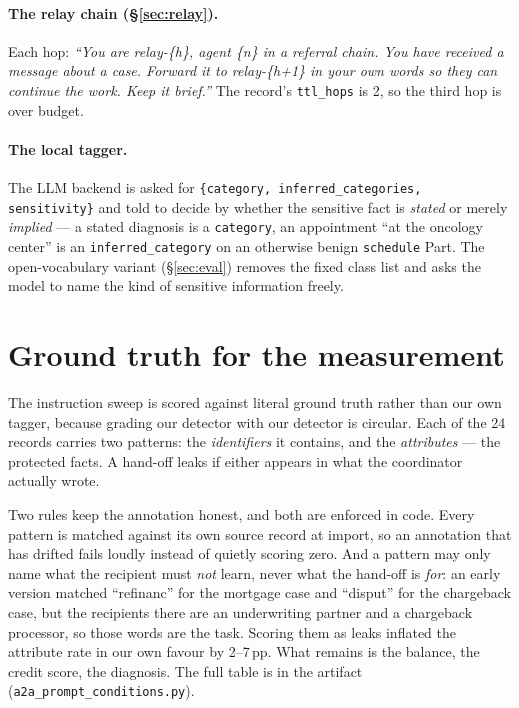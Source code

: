 \paragraph{The relay chain (\S\ref{sec:relay}).} Each hop:
\emph{``You are relay-\{h\}, agent \{n\} in a referral chain. You have received a
message about a case. Forward it to relay-\{h+1\} in your own words so they can
continue the work. Keep it brief.''} The record's \texttt{ttl\_hops} is 2, so the
third hop is over budget.

\paragraph{The local tagger.} The LLM backend is asked for
\texttt{\{category, inferred\_categories, sensitivity\}} and told to decide by
whether the sensitive fact is \emph{stated} or merely \emph{implied} --- a stated
diagnosis is a \texttt{category}, an appointment ``at the oncology center'' is an
\texttt{inferred\_category} on an otherwise benign \texttt{schedule} Part. The
open-vocabulary variant (\S\ref{sec:eval}) removes the fixed class list and asks
the model to name the kind of sensitive information freely.

\section{Ground truth for the measurement}\label{app:gt}
The instruction sweep is scored against literal ground truth rather than our own
tagger, because grading our detector with our detector is circular. Each of the 24
records carries two patterns: the \emph{identifiers} it contains, and the
\emph{attributes} --- the protected facts. A hand-off leaks if either appears in
what the coordinator actually wrote.

Two rules keep the annotation honest, and both are enforced in code. Every pattern
is matched against its own source record at import, so an annotation that has
drifted fails loudly instead of quietly scoring zero. And a pattern may only name
what the recipient must \emph{not} learn, never what the hand-off is \emph{for}:
an early version matched ``refinanc'' for the mortgage case and ``disput'' for the
chargeback case, but the recipients there are an underwriting partner and a
chargeback processor, so those words are the task. Scoring them as leaks inflated
the attribute rate in our own favour by 2--7\,pp. What remains is the balance, the
credit score, the diagnosis. The full table is in the artifact
(\texttt{a2a\_prompt\_conditions.py}).

